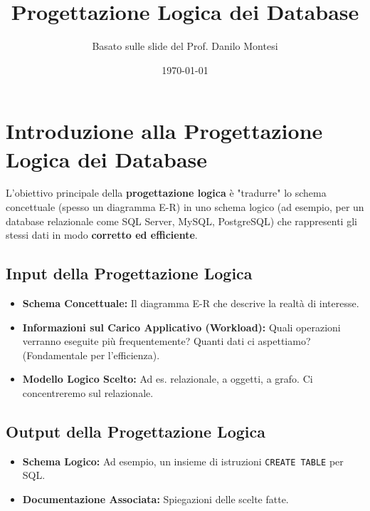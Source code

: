 

\usepackage{hyperref}

\title{Progettazione Logica dei Database}
\author{Basato sulle slide del Prof. Danilo Montesi}
\date{\today}


	
	\maketitle
	\tableofcontents
	\newpage
	
	\section{Introduzione alla Progettazione Logica dei Database}
	L'obiettivo principale della \textbf{progettazione logica} è "tradurre" lo schema concettuale (spesso un diagramma E-R) in uno schema logico (ad esempio, per un database relazionale come SQL Server, MySQL, PostgreSQL) che rappresenti gli stessi dati in modo \textbf{corretto ed efficiente}.
	
	\subsection{Input della Progettazione Logica}
	\begin{itemize}
		\item \textbf{Schema Concettuale:} Il diagramma E-R che descrive la realtà di interesse.
		\item \textbf{Informazioni sul Carico Applicativo (Workload):} Quali operazioni verranno eseguite più frequentemente? Quanti dati ci aspettiamo? (Fondamentale per l'efficienza).
		\item \textbf{Modello Logico Scelto:} Ad es. relazionale, a oggetti, a grafo. Ci concentreremo sul relazionale.
	\end{itemize}
	
	\subsection{Output della Progettazione Logica}
	\begin{itemize}
		\item \textbf{Schema Logico:} Ad esempio, un insieme di istruzioni \texttt{CREATE TABLE} per SQL.
		\item \textbf{Documentazione Associata:} Spiegazioni delle scelte fatte.
	\end{itemize}
	
